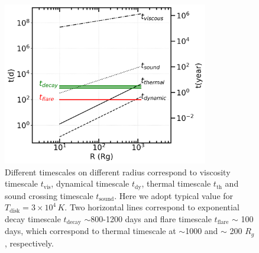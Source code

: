\documentclass[twocolumn]{aastex63}
\begin{document}
\begin{figure}
\centering
	\includegraphics[width=0.8\textwidth]{./pic/Mrk1018_timescale.png}
    \caption{Different timescales on different radius correspond to viscosity timescale $t_\mathrm{vis}$, dynamical timescale $t_\mathrm{dy}$, thermal timescale $t_\mathrm{th}$ and sound crossing timescale $t_\mathrm{sound}$. Here we adopt typical value for $T_\mathrm{disk}=3\times10^4\, K$. Two horizontal lines correspond to exponential decay timescale $t_\mathrm{decay}$ $\sim$800-1200 days and flare timescale $t_\mathrm{flare}$ $\sim$ 100 days, which correspond to thermal timescale at $\sim$1000 and $\sim$ 200 $R_g$, respectively.}
    \label{fig:timescale}
\end{figure}
\end{document}
